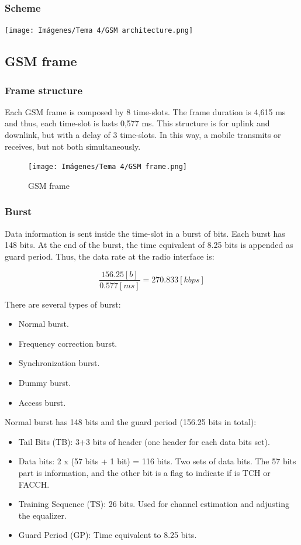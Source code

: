 \documentclass[
	12pt,
	twoside
]{book}
\begin{document}
\subsubsection{Scheme}

\texttt{[image: Imágenes/Tema 4/GSM architecture.png]}

\subsection{GSM frame}

\subsubsection{Frame structure}

Each GSM frame is composed by 8 time-slots. The frame duration is 4,615 ms and thus, each time-slot is lasts 0,577 ms. This structure is for uplink and downlink, but with a delay of 3 time-slots. In this way, a mobile transmits or receives, but not both simultaneously.

\begin{figure}[H]
	\centering
	\texttt{[image: Imágenes/Tema 4/GSM frame.png]}
	\caption{
		\label{fig:unit4_GSM_frame}
		GSM frame
	}
\end{figure}

\subsubsection{Burst}

Data information is sent inside the time-slot in a burst of bits. Each burst has 148 bits. At the end of the burst, the time equivalent of 8.25 bits is appended as guard period. Thus, the data rate at the radio interface is:

$$
	\frac {156.25 [b]} {0.577 [ms]} = 270.833 [kbps]
$$

There are several types of burst:
\begin{itemize}
	\item Normal burst.
	\item Frequency correction burst.
	\item Synchronization burst.
	\item Dummy burst.
	\item Access burst.
\end{itemize}

Normal burst has 148 bits and the guard period (156.25 bits in total):
\begin{itemize}
	\item Tail Bits (TB): 3+3 bits of header (one header for each data bits set).
	\item Data bits: 2 x (57 bits + 1 bit) = 116 bits. Two sets of data bits. The 57 bits part is information, and the other bit is a flag to indicate if is TCH or FACCH.
	\item Training Sequence (TS): 26 bits. Used for channel estimation and adjusting the equalizer.
	\item Guard Period (GP): Time equivalent to 8.25 bits.
\end{itemize}
\end{document}
